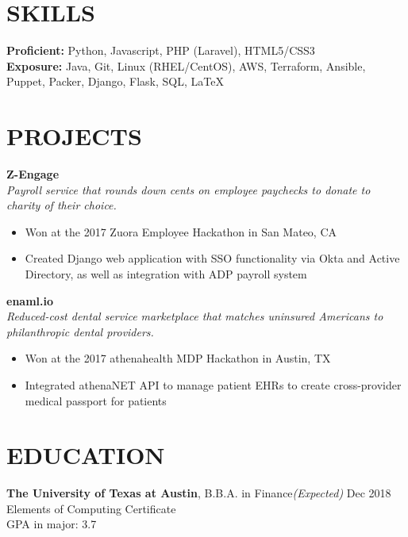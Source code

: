 \documentclass{./templates/resume}
\begin{document}
\section{SKILLS}
\textbf{Proficient:} Python, Javascript, PHP (Laravel), HTML5/CSS3\\
\textbf{Exposure:} Java, Git, Linux (RHEL/CentOS), AWS, Terraform, Ansible, Puppet, Packer, Django, Flask, SQL, \LaTeX
\vspace{5pt}

\section{PROJECTS}
\textbf{Z-Engage}\\
\emph{Payroll service that rounds down cents on employee paychecks to donate to charity of their choice.}
\begin{itemize}\itemsep0.3em
\item Won at the 2017 Zuora Employee Hackathon in San Mateo, CA
\item Created Django web application with SSO functionality via Okta and Active Directory, as well as integration with ADP payroll system
\end{itemize}\vspace{5pt}

\textbf{enaml.io}\\
\emph{Reduced-cost dental service marketplace that matches uninsured Americans to philanthropic dental providers.}
\begin{itemize}\itemsep0.3em
\item Won at the 2017 athenahealth MDP Hackathon in Austin, TX
\item Integrated athenaNET API to manage patient EHRs to create cross-provider medical passport for patients
\end{itemize}\vspace{5pt}

\section{EDUCATION}
\textbf{The University of Texas at Austin}, B.B.A. in Finance\hfill {\emph{(Expected)} Dec 2018}\\
Elements of Computing Certificate\\
GPA in major: 3.7
\end{document}
